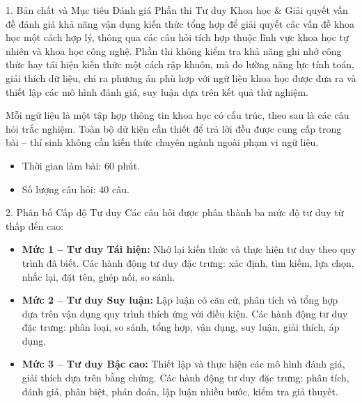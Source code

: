 \documentclass[12pt,a4paper,twoside]{article}
\begin{document}
\begin{sectionheader}{1. Bản chất và Mục tiêu Đánh giá}
Phần thi Tư duy Khoa học \& Giải quyết vấn đề đánh giá khả năng vận dụng kiến thức tổng hợp để giải quyết các vấn đề khoa học một cách hợp lý, thông qua các câu hỏi tích hợp thuộc lĩnh vực khoa học tự nhiên và khoa học công nghệ. Phần thi không kiểm tra khả năng ghi nhớ công thức hay tái hiện kiến thức một cách rập khuôn, mà đo lường năng lực tính toán, giải thích dữ liệu, chỉ ra phương án phù hợp với ngữ liệu khoa học được đưa ra và thiết lập các mô hình đánh giá, suy luận dựa trên kết quả thử nghiệm.

\vspace{2pt}
Mỗi ngữ liệu là một tập hợp thông tin khoa học có cấu trúc, theo sau là các câu hỏi trắc nghiệm. Toàn bộ dữ kiện cần thiết để trả lời đều được cung cấp trong bài -- thí sinh không cần kiến thức chuyên ngành ngoài phạm vi ngữ liệu.

\vspace{2pt}
\begin{itemize}[leftmargin=*, itemsep=3pt, label=\textcolor{accentBlue}{\textbf{--}}]
\item Thời gian làm bài: 60 phút.
\item Số lượng câu hỏi: 40 câu.
\end{itemize}
\end{sectionheader}
\vspace{2pt}

\begin{sectionheader}{2. Phân bố Cấp độ Tư duy}
Các câu hỏi được phân thành ba mức độ tư duy từ thấp đến cao:

\vspace{2pt}
\begin{itemize}[leftmargin=*, itemsep=5pt, label=\textcolor{accentBlue}{\textbf{--}}]
\item \textbf{Mức 1 -- Tư duy Tái hiện:} Nhớ lại kiến thức và thực hiện tư duy theo quy trình đã biết. Các hành động tư duy đặc trưng: xác định, tìm kiếm, lựa chọn, nhắc lại, đặt tên, ghép nối, so sánh.
\item \textbf{Mức 2 -- Tư duy Suy luận:} Lập luận có căn cứ, phân tích và tổng hợp dựa trên vận dụng quy trình thích ứng với điều kiện. Các hành động tư duy đặc trưng: phân loại, so sánh, tổng hợp, vận dụng, suy luận, giải thích, áp dụng.
\item \textbf{Mức 3 -- Tư duy Bậc cao:} Thiết lập và thực hiện các mô hình đánh giá, giải thích dựa trên bằng chứng. Các hành động tư duy đặc trưng: phân tích, đánh giá, phân biệt, phán đoán, lập luận nhiều bước, kiểm tra giả thuyết.
\end{itemize}
\end{sectionheader}
\vspace{2pt}
\end{document}

